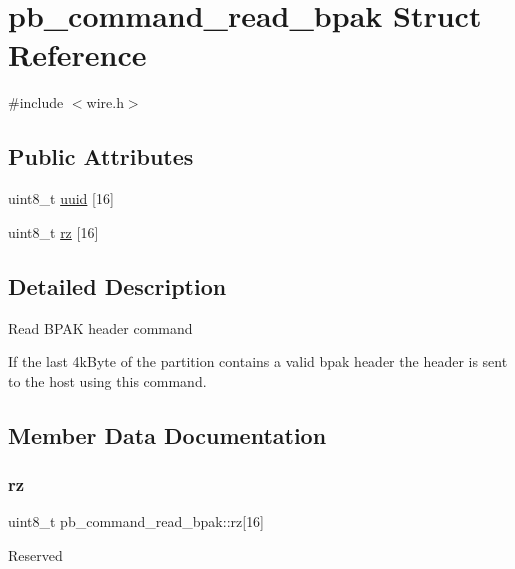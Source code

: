 \hypertarget{structpb__command__read__bpak}{}\section{pb\+\_\+command\+\_\+read\+\_\+bpak Struct Reference}
\label{structpb__command__read__bpak}


{\ttfamily \#include $<$wire.\+h$>$}

\subsection*{Public Attributes}
\begin{DoxyCompactItemize}
\item 
uint8\+\_\+t \hyperlink{structpb__command__read__bpak_a864071f41f9639da6b9bdd0634664382}{uuid} \mbox{[}16\mbox{]}
\item 
uint8\+\_\+t \hyperlink{structpb__command__read__bpak_aead50c13a66431b183a78ba2af349c10}{rz} \mbox{[}16\mbox{]}
\end{DoxyCompactItemize}


\subsection{Detailed Description}
Read B\+P\+AK header command

If the last 4k\+Byte of the partition contains a valid bpak header the header is sent to the host using this command. 

\subsection{Member Data Documentation}
\mbox{\label{structpb__command__read__bpak_aead50c13a66431b183a78ba2af349c10}} 
\subsubsection{\texorpdfstring{rz}{rz}}
{\footnotesize\ttfamily uint8\+\_\+t pb\+\_\+command\+\_\+read\+\_\+bpak\+::rz\mbox{[}16\mbox{]}}

Reserved \mbox{\label{structpb__command__read__bpak_a864071f41f9639da6b9bdd0634664382}} 

